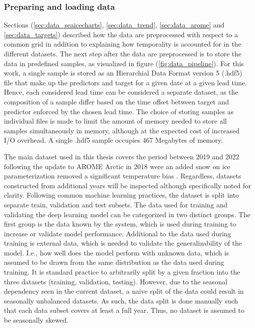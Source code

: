 \documentclass[../main/thesis]{subfiles}
\begin{document}
\subsubsection{Preparing and loading data}
\label{sec:dataloader}
Sections (\ref{sec:data_seaicecharts}, \ref{sec:data_trend}, \ref{sec:data_arome} and \ref{sec:data_targets}) described how the data are preprocessed with respect to a common grid in addition to explaining how temporality is accounted for in the different datasets. The next step after the data are preprocessed is to store the data in predefined samples, as visualized in figure (\ref{fig:data_pipeline}). For this work, a single sample is stored as an Hierarchial Data Format version 5 (.hdf5) file that make up the predictors and target for a given date at a given lead time. Hence, each considered lead time can be considered a separate dataset, as the composition of a sample differ based on the time offset between target and predictor enforced by the chosen lead time. The choice of storing samples as individual files is made to limit the amount of memory needed to store all samples simultaneously in memory, although at the expected cost of increased I/O overhead. A single .hdf5 sample occupies 467 Megabytes of memory.

The main dataset used in this thesis covers the period between 2019 and 2022 following the update to AROME Arctic in 2018 were an added snow on ice parameterization removed a significant temperature bias \citep{Batrak2019}. Regardless, datasets constructed from additional years will be inspected although specifically noted for clarity. Following common machine learning practices, the dataset is split into separate train, validation and test subsets. The data used for training and validating the deep learning model can be categorized in two distinct groups. The first group is the data known by the system, which is used during training to increase or validate model performance. Additional to the data used during training is external data, which is needed to validate the generalizability of the model. I.e., how well does the model perform with unknown data, which is assumed to be drawn from the same distribution as the data used during training. It is standard practice to arbitrarily split by a given fraction into the three datasets (training, validation, testing). However, due to the seasonal dependency seen in the current dataset, a naive split of the data could result in seasonally unbalanced datasets. As such, the data split is done manually such that each data subset covers at least a full year. Thus, no dataset is assumed to be seasonally skewed.
\end{document}
